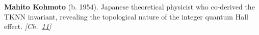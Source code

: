 \textbf{Mahito Kohmoto} (b. 1954). Japanese theoretical physicist who co-derived the TKNN invariant, revealing the topological nature of the integer quantum Hall effect. \emph{[Ch.~\hyperref[ch:topologicalinsulators]{11}]}

